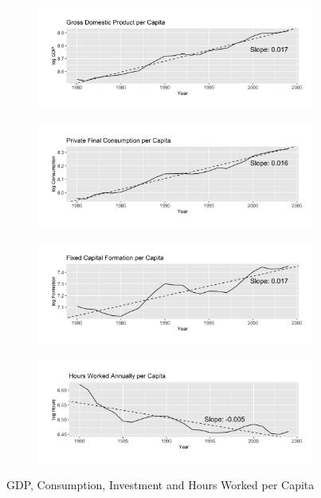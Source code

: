 \documentclass[12pt]{article}
\begin{document}
\begin{figure}
    \centering
    \begin{subfigure}[b]{1\textwidth}
      \includegraphics[width=\textwidth]{OUTPUT/MEDIA/loggdp_pc.png}
    \end{subfigure}
    \vspace{-20pt}
    \begin{subfigure}[b]{1\textwidth}
      \includegraphics[width=\textwidth]{OUTPUT/MEDIA/logcons_pc.png}
    \end{subfigure}
    \vspace{-20pt}
    \begin{subfigure}[b]{1\textwidth}
      \includegraphics[width=\textwidth]{OUTPUT/MEDIA/loginv_pc.png}
    \end{subfigure}
    \vspace{-20pt}
    \begin{subfigure}[b]{1\textwidth}
      \includegraphics[width=\textwidth]{OUTPUT/MEDIA/loghours_pc.png}
    \end{subfigure}
    \caption{GDP, Consumption, Investment and Hours Worked per Capita}
    \label{fig:descriptive}
\end{figure}
\end{document}
